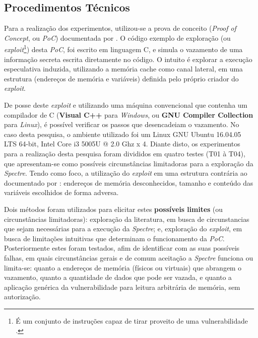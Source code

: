 \documentclass[
	article,			    %
	12pt,				    %
	oneside,			    %
	a4paper,			    %
	chapter=TITLE,		    %
	section=TITLE,		    %
	subsection=TITLE,	    %
	english,			    %
	brazil,				    %
	sumario=tradicional
]{abntex2}
\begin{document}
\subsection{Procedimentos Técnicos}
Para a realização dos experimentos, utilizou-se a prova de conceito (\emph{Proof of Concept}, ou \emph{PoC}) documentada por . O código exemplo de exploração (ou \emph{exploit}\footnote{É um conjunto de instruções \cite{Cruz2016Estudo} capaz de tirar proveito de uma vulnerabilidade \cite{Cambridge2019Exploit}.}) desta \emph{PoC}, foi escrito em linguagem C, e simula o vazamento de uma informação secreta escrita diretamente no código. O intuito é explorar a execução especulativa induzida, utilizando a memória cache como canal lateral, em uma estrutura (endereços de memória e variáveis) definida pelo próprio criador do \emph{exploit}. 

De posse deste \emph{exploit} e utilizando uma máquina convencional que contenha um compilador de C (\textbf{Visual C++} para \emph{Windows}, ou \textbf{GNU Compiler Collection} para \emph{Linux}), é possível verificar os passos que desencadeiam o vazamento. No caso desta pesquisa, o ambiente utilizado foi um Linux GNU Ubuntu 16.04.05 LTS 64-bit, Intel\textsuperscript{\tiny\textregistered} Core\textsuperscript{\tiny\texttrademark} i3 5005U @ 2.0 Ghz x 4. Diante disto, os experimentos para a realização desta pesquisa foram divididos em quatro testes (T01 à T04), que apresentam-se como possíveis circunstâncias limitadoras para a exploração da \emph{Spectre}. Tendo como foco, a utilização do \emph{exploit} em uma estrutura contrária ao documentado por : endereços de memória desconhecidos, tamanho e conteúdo das variáveis escolhidos de forma adversa.

Dois métodos foram utilizados para elicitar estes \textbf{possíveis limites} (ou circunstâncias limitadoras): exploração da literatura, em busca de circunstancias que sejam necessárias para a execução da \emph{Spectre}; e, exploração do \emph{exploit}, em busca de limitações intuitivas que determinam o funcionamento da \emph{PoC}. Posteriormente estes foram testados, afim de identificar com as suas possíveis falhas, em quais circunstâncias gerais e de comum aceitação a \emph{Spectre} funciona ou limita-se: quanto a endereços de memória (físicos ou virtuais) que abrangem o vazamento, quanto a quantidade de dados que pode ser vazada, e quanto a aplicação genérica da vulnerabilidade para leitura arbitrária de memória, sem autorização.
\end{document}
